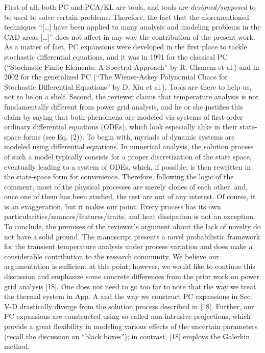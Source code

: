 \begin{authors}
First of all, both PC and PCA/KL are tools, and tools are \emph{designed/supposed} to be used to solve certain problems.
Therefore, the fact that the aforementioned techniques ``[\ldots] have been applied to many analysis and modeling problems in the CAD areas [\ldots]'' does not affect in any way the contribution of the present work.
As a matter of fact, PC expansions were developed in the first place to tackle stochastic differential equations, and it was in 1991 for the classical PC (``Stochastic Finite Elements: A Spectral Approach'' by R. Ghanem et al.) and in 2002 for the generalized PC (``The Wiener-Askey Polynomial Chaos for Stochastic Differential Equations'' by D. Xiu et al.).
Tools are there to help us, not to lie on a shelf.
Second, the reviewer claims that temperature analysis is not fundamentally different from power grid analysis, and he or she justifies this claim by saying that both phenomena are modeled via systems of first-order ordinary differential equations (ODEs), which look especially alike in their state-space forms (see Eq. (2)).
To begin with, myriads of dynamic systems are modeled using differential equations.
In numerical analysis, the solution process of such a model typically consists for a proper discretization of the state space, eventually leading to a system of ODEs, which, if possible, is then rewritten in the state-space form for convenience.
Therefore, following the logic of the comment, most of the physical processes are merely clones of each other, and, once one of them has been studied, the rest are out of any interest.
Of course, it is an exaggeration, but it makes our point.
Every process has its own particularities/nuances/features/traits, and heat dissipation is not an exception.
To conclude, the premises of the reviewer’s argument about the lack of novelty do not have a solid ground.
The manuscript presents a novel probabilistic framework for the transient temperature analysis under process variation and does make a considerable contribution to the research community.
We believe our argumentation is sufficient at this point; however, we would like to continue this discussion and emphasize some concrete differences from the prior work on power grid analysis [18].
One does not need to go too far to note that the way we treat the thermal system in App. A and the way we construct PC expansions in Sec. V-D drastically diverge from the solution process described in [18].
Further, our PC expansions are constructed using so-called non-intrusive projections, which provide a great flexibility in modeling various effects of the uncertain parameters (recall the discussion on ``black boxes''); in contrast, [18] employs the Galerkin method.

\end{authors}
